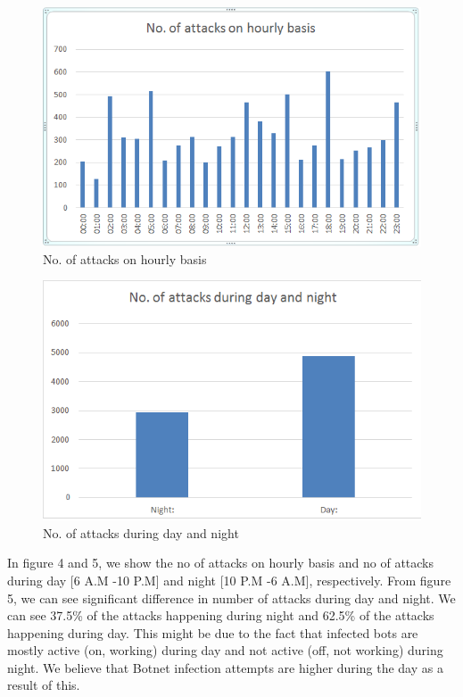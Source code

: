 
\begin{figure}[h]
	\caption{No. of attacks on hourly basis}
	\label{fig:A}
	\centering
	\includegraphics[width=\linewidth]{images/A}
\end{figure}
\begin{figure}[h]
	\caption{No. of attacks during day and night}
	\label{fig:B}
	\centering
	\includegraphics[width=\linewidth]{images/B}
\end{figure}


In figure 4 and 5, we show the no of attacks on hourly basis and no of attacks during day [6 A.M -10 P.M] and night [10 P.M -6 A.M], respectively. From figure 5, we can see significant difference in number of attacks during day and night. We can see 37.5\% of the attacks happening during night and 62.5\% of the attacks happening during day. This might be due to the fact that infected bots are mostly active (on, working) during day and not active (off, not working) during night. We believe that Botnet infection attempts are higher during the day as a result of this.

